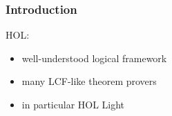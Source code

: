 \begin{frame}
\frametitle{Introduction}

\begin{block}{HOL:}
  \begin{itemize}
  \item well-understood logical framework
  \item many LCF-like theorem provers
  \item in particular HOL Light
  \end{itemize}
\end{block}

\end{frame}
